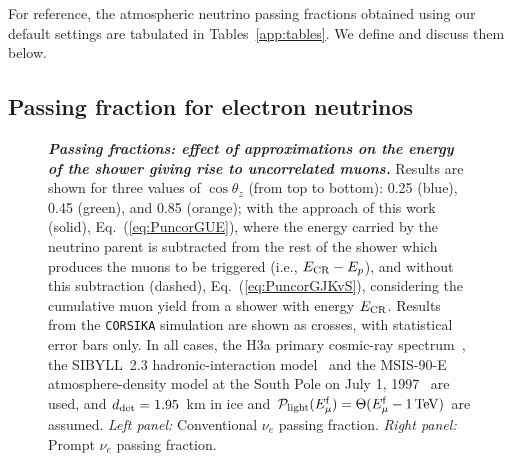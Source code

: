 \documentclass[aps,prd,showpacs,letterpaper,onecolumn,longbibliography,superscriptaddress,notitlepage,nofootinbib]{revtex4-1}%
\newcommand{\Emf}{E_{\mu}^{\rm f}}
\newcommand{\ECR}{E_{\rm CR}}
\newcommand{\Prob}{{\cal P}}
\newcommand{\CORSIKA}{\texttt{CORSIKA}}
\begin{document}
For reference, the atmospheric neutrino passing fractions obtained using our default settings are tabulated in Tables~\ref{app:tables}. We define and discuss them below.

\subsection{Passing fraction for electron neutrinos}
\label{sec:pfnue}

\begin{figure}
\centering
\caption{\textbf{\textit{Passing fractions: effect of approximations on the energy of the shower giving rise to uncorrelated muons.}} Results are shown for three values of $\cos\theta_z$ (from top to bottom): 0.25 (blue), 0.45 (green), and 0.85 (orange); with the approach of this work (solid), Eq.~(\ref{eq:PuncorGUE}), where the energy carried by the neutrino parent is subtracted from the rest of the shower which produces the muons to be triggered (i.e., $\ECR - E_p$), and without this subtraction (dashed), Eq.~(\ref{eq:PuncorGJKvS}), considering the cumulative muon yield from a shower with energy $\ECR$. Results from the \CORSIKA{} simulation are shown as crosses, with statistical error bars only. In all cases, the H3a primary cosmic-ray spectrum~\cite{Gaisser:2011cc}, the SIBYLL~2.3 hadronic-interaction model~\cite{Engel:2015dxa, Riehn:2015oba} and the MSIS-90-E atmosphere-density model at the South Pole on July 1, 1997~\cite{Labitzke:1985, Hedin:1991} are used, and $d_{\rm det} = 1.95$~km in ice and $\Prob_{\rm light}(\Emf) = \Theta(\Emf - 1\,{\rm TeV})$ are assumed. \textit{Left panel:} Conventional $\nu_e$ passing fraction. \textit{Right panel:} Prompt $\nu_e$ passing fraction.
}
\end{figure}
\end{document}
